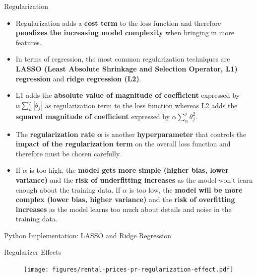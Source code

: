 \documentclass[main.tex]{subfiles}
\begin{document}
    \begin{frame}{Regularization}
        \begin{itemize}
            \item Regularization adds a \textbf{cost term} to the loss function and therefore \textbf{penalizes the increasing model complexity} when bringing in more features. 
            \item In terms of regression, the most common regularization techniques are \textbf{LASSO (Least Absolute Shrinkage and Selection Operator, L1) regression} and \textbf{ridge regression (L2)}. 
            \item L1 adds the \textbf{absolute value of magnitude of coefficient} expressed by $\alpha \sum_{n}^{j} |\theta_j|$ as regularization term to the loss function whereas L2 adds the \textbf{squared magnitude of coefficient} expressed by $\alpha \sum_{n}^{j} \theta_j^2$.
            \item The \textbf{regularization rate} $\pmb{\alpha}$ is another \textbf{hyperparameter} that controls the \textbf{impact of the regularization term} on the overall loss function and therefore must be chosen carefully.
            \item If $\alpha$ is too high, the \textbf{model gets more simple (higher bias, lower variance)} and the \textbf{risk of underfitting increases} as the model won't learn enough about the training data.  If $\alpha$ is too low, the \textbf{model will be more complex (lower bias, higher variance)} and the \textbf{risk of overfitting increases} as the model learns too much about details and noise in the training data.
        \end{itemize}
    \end{frame}

    \begin{frame}{Python Implementation: LASSO and Ridge Regression}
        
    \end{frame}

    \begin{frame}{Regularizer Effects}
        \begin{figure}
            \label{fig:rental-prices-pr-regularization-effect}
            \texttt{[image: figures/rental-prices-pr-regularization-effect.pdf]}
        \end{figure}
    \end{frame}
    
\end{document}
